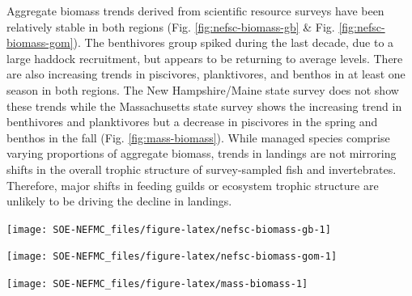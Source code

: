 \documentclass[
  10pt,
]{article}
\let\origfigure\figure
\let\endorigfigure\endfigure
\renewenvironment{figure}[1][2] {
    \expandafter\origfigure\expandafter[H]
} {
    \endorigfigure
}
\begin{document}
Aggregate biomass trends derived from scientific resource surveys have been relatively stable in both regions (Fig. \ref{fig:nefsc-biomass-gb} \& Fig. \ref{fig:nefsc-biomass-gom}). The benthivores group spiked during the last decade, due to a large haddock recruitment, but appears to be returning to average levels. There are also increasing trends in piscivores, planktivores, and benthos in at least one season in both regions. The New Hampshire/Maine state survey does not show these trends while the Massachusetts state survey shows the increasing trend in benthivores and planktivores but a decrease in piscivores in the spring and benthos in the fall (Fig. \ref{fig:mass-biomass}). While managed species comprise varying proportions of aggregate biomass, trends in landings are not mirroring shifts in the overall trophic structure of survey-sampled fish and invertebrates. Therefore, major shifts in feeding guilds or ecosystem trophic structure are unlikely to be driving the decline in landings.

\begin{figure}

{\centering \texttt{[image: SOE-NEFMC\_files/figure-latex/nefsc-biomass-gb-1]} 

}

\caption{Spring (left) and fall (right) surveyed biomass on Georges Bank. The shaded area around each annual mean represents 2 standard deviations from the mean.}\label{fig:nefsc-biomass-gb}
\end{figure}

\begin{figure}

{\centering \texttt{[image: SOE-NEFMC\_files/figure-latex/nefsc-biomass-gom-1]} 

}

\caption{Spring (left) and fall (right) surveyed biomass in the Gulf of Maine. The shaded area around each annual mean represents 2 standard deviations from the mean.}\label{fig:nefsc-biomass-gom}
\end{figure}

\begin{figure}

{\centering \texttt{[image: SOE-NEFMC\_files/figure-latex/mass-biomass-1]} 

}

\caption{Spring (left) and fall (right) surveyed biomass from the state of Massachusetts inshore survey. The shaded area around each annual mean represents 2 standard deviations from the mean.}\label{fig:mass-biomass}
\end{figure}
\end{document}
